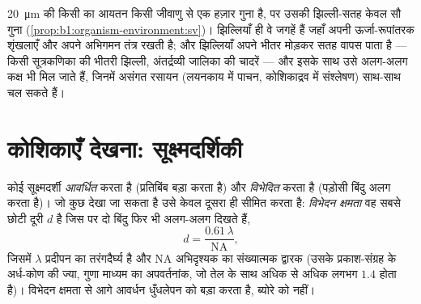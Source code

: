 \begin{example}[सुकेंद्रकी कोशिका कक्षों में क्यों बँटी है]\label{ex:b1:cell-unit-of-life:whycompart}
\qty{20}{\micro m} की किसी  का आयतन किसी जीवाणु से एक हज़ार गुना
है, पर उसकी झिल्ली-सतह केवल सौ गुना
(\cref{prop:b1:organism-environment:sv})। झिल्लियाँ ही वे जगहें हैं जहाँ
 अपनी ऊर्जा-रूपांतरक शृंखलाएँ और अपने अभिगमन तंत्र रखती है; और
  झिल्लियाँ अपने भीतर मोड़कर सतह वापस पाता है --- किसी
सूत्रकणिका की भीतरी झिल्ली, अंतर्द्रव्यी जालिका की चादरें --- और इसके
साथ उसे अलग-अलग कक्ष भी मिल जाते हैं, जिनमें असंगत रसायन (लयनकाय में
पाचन, कोशिकाद्रव में संश्लेषण) साथ-साथ चल सकते हैं।
\end{example}

\section{कोशिकाएँ देखना: सूक्ष्मदर्शिकी}

\begin{definition}[आवर्धन और विभेदन]\label{def:b1:cell-unit-of-life:resolution}
कोई सूक्ष्मदर्शी \emph{आवर्धित} करता है (प्रतिबिंब बड़ा
करता है) और \emph{विभेदित} करता है (पड़ोसी बिंदु अलग
करता है)। जो कुछ देखा जा सकता है उसे केवल दूसरा ही सीमित करता है:
\emph{विभेदन क्षमता} वह सबसे छोटी दूरी $d$ है जिस
पर दो बिंदु फिर भी अलग-अलग दिखते हैं,
\[
d = \frac{0.61\,\lambda}{\mathrm{NA}},
\]
जिसमें $\lambda$ प्रदीपन का तरंगदैर्घ्य है और $\mathrm{NA}$ अभिदृश्यक का
संख्यात्मक द्वारक (उसके प्रकाश-संग्रह के अर्ध-कोण की ज्या, गुणा माध्यम
का अपवर्तनांक, जो तेल के साथ अधिक से अधिक लगभग $1.4$ होता है)। विभेदन
क्षमता से आगे आवर्धन धुँधलेपन को बड़ा करता है, ब्योरे को नहीं।
\end{definition}

